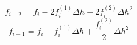 \begin{equation} 
f_{{i-2}} = f_{i} - 2 f^{{(1)}}_{i} {\Delta h} + 2 f^{{(2)}}_{i} {\Delta h}^{2}
 \end{equation} 
\begin{equation} 
f_{{i-1}} = f_{i} - f^{{(1)}}_{i} {\Delta h} + \frac{f^{{(2)}}_{i}}{2} {\Delta h}^{2}
 \end{equation} 
